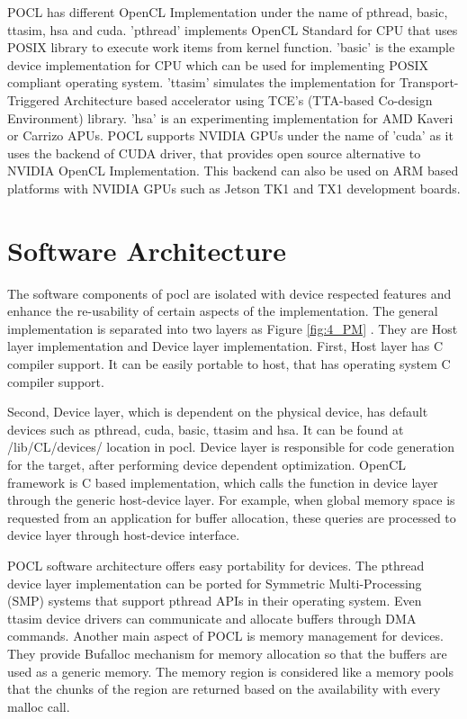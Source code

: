 POCL has different OpenCL Implementation under the name of pthread, basic, ttasim, hsa and cuda. 'pthread' implements OpenCL Standard for CPU that uses POSIX library to execute work items from kernel function. 'basic' is the example device implementation for CPU which can be used for implementing POSIX compliant operating system. 'ttasim' simulates the implementation for Transport-Triggered Architecture based accelerator using TCE’s (TTA-based Co-design Environment) library. 'hsa' is an experimenting implementation for AMD Kaveri or Carrizo APUs. POCL supports NVIDIA GPUs under the name of 'cuda' as it uses the backend of CUDA driver, that provides open source alternative to NVIDIA OpenCL Implementation. This backend can also be used on ARM based platforms with NVIDIA GPUs such as Jetson TK1 and TX1 development boards.
 
\section{Software Architecture}
The software components of pocl are isolated with device respected features and enhance the re-usability of certain aspects of the implementation. The general implementation is separated into two layers as Figure \ref{fig:4_PM} \cite{18}. They are Host layer implementation and Device layer implementation. First, Host layer has C compiler support. It can be easily portable to host, that has operating system C compiler support.


Second, Device layer, which is dependent on the physical device, has default devices such as pthread, cuda, basic, ttasim and hsa. It can be found at /lib/CL/devices/ location in pocl. Device layer is responsible for code generation for the target, after performing device dependent optimization. OpenCL framework is C based implementation, which calls the function in device layer through the generic host-device layer. For example, when global memory space is requested from an application for buffer allocation, these queries are processed to device layer through host-device interface.

POCL software architecture offers easy portability for devices. The pthread device layer implementation can be ported for Symmetric Multi-Processing (SMP) systems that support pthread APIs in their operating system. Even ttasim device drivers can communicate and allocate buffers through DMA commands. Another main aspect of POCL is memory management for devices. They provide Bufalloc mechanism for memory allocation so that the buffers are used as a generic memory. The memory region is considered like a memory pools that the chunks of the region are returned based on the availability with every malloc call. 


